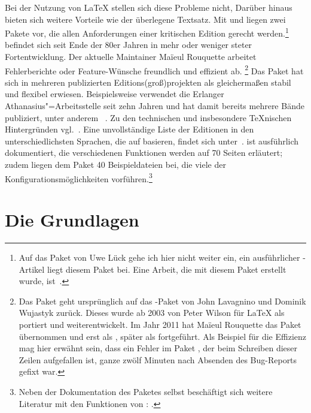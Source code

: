 Bei der Nutzung von \LaTeX{} stellen sich diese Probleme nicht, Darüber hinaus bieten sich 
weitere Vorteile wie der überlegene Textsatz. Mit  und \reledmac 
liegen zwei Pakete vor, die allen Anforderungen einer kritischen Edition gerecht 
werden.\footnote{Auf das Paket  von Uwe Lück gehe ich 
hier nicht weiter ein, ein ausführlicher \TUGboat-Artikel liegt diesem Paket bei. 
Eine Arbeit, die mit diesem Paket erstellt wurde, ist~\cite{mariev:joh_ant}.} 
\reledmac befindet sich seit Ende der 80er Jahren in mehr oder weniger steter Fortentwicklung. 
Der aktuelle Maintainer Maïeul Rouquette arbeitet Fehlerberichte oder Feature-Wünsche 
freundlich und effizient ab.%
\footnote{%
	Das Paket \reledmac geht 
	ursprünglich auf das \plainTeX{}-Paket  von John Lavagnino und 
	Dominik Wujastyk zurück. Dieses wurde ab 2003 von Peter Wilson für \LaTeX{} 
	als  portiert und weiterentwickelt. Im Jahr 2011 hat Maïeul 
	Rouquette das Paket übernommen und erst als , später als \reledmac fortgeführt. 
	Als Beispiel für die Effizienz mag hier erwähnt sein, dass ein Fehler im Paket 
	\reledmac, der beim Schreiben dieser Zeilen aufgefallen ist, ganze zwölf Minuten nach 
	Absenden des Bug-Reports gefixt war.}
Das Paket hat sich in mehreren publizierten 
Editions(groß)projekten als gleichermaßen stabil und flexibel erwiesen. %
Beispielsweise verwendet die Erlanger Athanasius"=Arbeitsstelle %
seit zehn Jahren 
 und hat damit bereits mehrere Bände publiziert, unter anderem%
~\cite{athanasius_3_1_4}. Zu den technischen und insbesondere \TeX{}nischen 
Hintergründen vgl.~\cite{stockhausen:mde2016/2}. Eine unvollständige Liste der Editionen in den unterschiedlichsten 
Sprachen, die auf  basieren, findet sich unter~\cite{reledmac-benutzung}. 
\reledmac ist 
ausführlich dokumentiert, die verschiedenen Funktionen werden auf 70 Seiten 
erläutert; zudem liegen dem Paket 40 Beispieldateien bei, die viele der 
Konfigurationsmöglichkeiten vorführen.\footnote{Neben der Dokumentation des Paketes selbst beschäftigt sich weitere Literatur mit den Funktionen von : \cite{reledmac-literatur}.}


\section{Die Grundlagen}\label{apparate-grundlagen-anfang}

